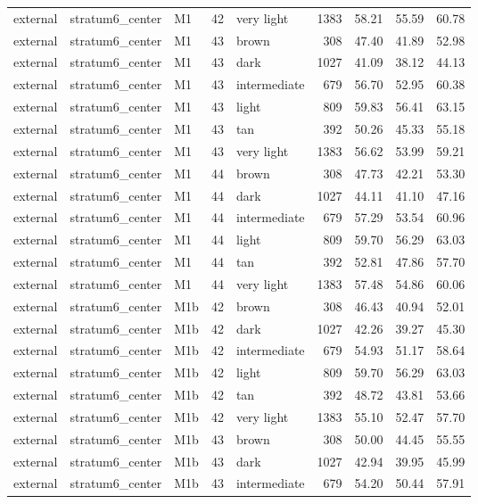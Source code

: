 \begin{tabular}{lllrlrrrr}
external & stratum6\_center & M1 & 42 & very light & 1383 & 58.21 & 55.59 & 60.78 \\
external & stratum6\_center & M1 & 43 & brown & 308 & 47.40 & 41.89 & 52.98 \\
external & stratum6\_center & M1 & 43 & dark & 1027 & 41.09 & 38.12 & 44.13 \\
external & stratum6\_center & M1 & 43 & intermediate & 679 & 56.70 & 52.95 & 60.38 \\
external & stratum6\_center & M1 & 43 & light & 809 & 59.83 & 56.41 & 63.15 \\
external & stratum6\_center & M1 & 43 & tan & 392 & 50.26 & 45.33 & 55.18 \\
external & stratum6\_center & M1 & 43 & very light & 1383 & 56.62 & 53.99 & 59.21 \\
external & stratum6\_center & M1 & 44 & brown & 308 & 47.73 & 42.21 & 53.30 \\
external & stratum6\_center & M1 & 44 & dark & 1027 & 44.11 & 41.10 & 47.16 \\
external & stratum6\_center & M1 & 44 & intermediate & 679 & 57.29 & 53.54 & 60.96 \\
external & stratum6\_center & M1 & 44 & light & 809 & 59.70 & 56.29 & 63.03 \\
external & stratum6\_center & M1 & 44 & tan & 392 & 52.81 & 47.86 & 57.70 \\
external & stratum6\_center & M1 & 44 & very light & 1383 & 57.48 & 54.86 & 60.06 \\
external & stratum6\_center & M1b & 42 & brown & 308 & 46.43 & 40.94 & 52.01 \\
external & stratum6\_center & M1b & 42 & dark & 1027 & 42.26 & 39.27 & 45.30 \\
external & stratum6\_center & M1b & 42 & intermediate & 679 & 54.93 & 51.17 & 58.64 \\
external & stratum6\_center & M1b & 42 & light & 809 & 59.70 & 56.29 & 63.03 \\
external & stratum6\_center & M1b & 42 & tan & 392 & 48.72 & 43.81 & 53.66 \\
external & stratum6\_center & M1b & 42 & very light & 1383 & 55.10 & 52.47 & 57.70 \\
external & stratum6\_center & M1b & 43 & brown & 308 & 50.00 & 44.45 & 55.55 \\
external & stratum6\_center & M1b & 43 & dark & 1027 & 42.94 & 39.95 & 45.99 \\
external & stratum6\_center & M1b & 43 & intermediate & 679 & 54.20 & 50.44 & 57.91 \\

\end{tabular}
